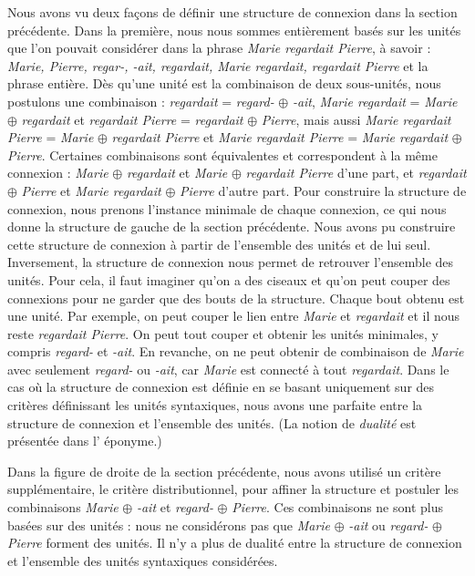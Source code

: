 Nous avons vu deux façons de définir une structure de connexion dans la section précédente. Dans la première, nous nous sommes entièrement basés sur les unités que l’on pouvait considérer dans la phrase \textit{Marie regardait Pierre}, à savoir : \textit{Marie, Pierre, regar-, -ait, regardait, Marie regardait, regardait Pierre} et la phrase entière. Dès qu’une unité est la combinaison de deux sous-unités, nous postulons une combinaison : \textit{regardait} = \textit{regard-} ${\oplus}$ \textit{{}-ait}, \textit{Marie regardait} = \textit{Marie} ${\oplus}$ \textit{regardait} et \textit{regardait Pierre} = \textit{regardait} ${\oplus}$ \textit{Pierre}, mais aussi \textit{Marie regardait Pierre} = \textit{Marie} ${\oplus}$ \textit{regardait Pierre} et \textit{Marie regardait Pierre} = \textit{Marie regardait} ${\oplus}$ \textit{Pierre}. Certaines combinaisons sont équivalentes et correspondent à la même connexion : \textit{Marie} ${\oplus}$ \textit{regardait} et \textit{Marie} ${\oplus}$ \textit{regardait Pierre} d’une part, et \textit{regardait} ${\oplus}$ \textit{Pierre} et \textit{Marie regardait} ${\oplus}$ \textit{Pierre} d’autre part. Pour construire la structure de connexion, nous prenons l’instance minimale de chaque connexion, ce qui nous donne la structure de gauche de la section précédente. Nous avons pu construire cette structure de connexion à partir de l’ensemble des unités et de lui seul. Inversement, la structure de connexion nous permet de retrouver l’ensemble des unités. Pour cela, il faut imaginer qu’on a des ciseaux et qu’on peut couper des connexions pour ne garder que des bouts de la structure. Chaque bout obtenu est une unité. Par exemple, on peut couper le lien entre \textit{Marie} et \textit{regardait} et il nous reste \textit{regardait Pierre}. On peut tout couper et obtenir les unités minimales, y compris \textit{regard-} et \-\textit{{}-ait}. En revanche, on ne peut obtenir de combinaison de \textit{Marie} avec seulement \textit{regard-} ou \-\textit{{}-ait}, car \textit{Marie} est connecté à tout \textit{regardait}. Dans le cas où la structure de connexion est définie en se basant uniquement sur des critères définissant les unités syntaxiques, nous avons une  parfaite entre la structure de connexion et l’ensemble des unités. (La notion de \textit{dualité} est présentée dans l’ éponyme.)

Dans la figure de droite de la section précédente, nous avons utilisé un critère supplémentaire, le critère distributionnel, pour affiner la structure et postuler les combinaisons \textit{Marie} ${\oplus}$ \textit{-ait} et \textit{regard-} ${\oplus}$ \textit{Pierre}. Ces combinaisons ne sont plus basées sur des unités : nous ne considérons pas que \textit{Marie} ${\oplus}$ \textit{-ait} ou \textit{regard-} ${\oplus}$ \textit{Pierre} forment des unités. Il n’y a plus de dualité entre la structure de connexion et l’ensemble des unités syntaxiques considérées.


